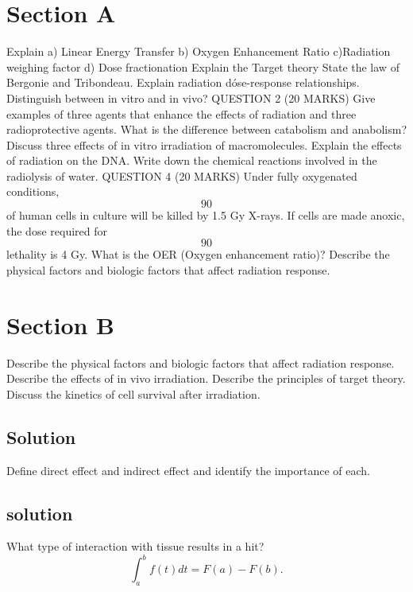 \documentclass{assignment}
\date{\today}                                   %
\begin{document}
\begin{problem}

\section{Section A}

\noindent Explain a) Linear Energy Transfer b) Oxygen Enhancement Ratio c)Radiation weighing factor d) Dose fractionation
\noindent Explain the Target theory
\noindent State the law of Bergonie and Tribondeau.
\noindent Explain radiation dóse-response relationships.
\noindent Distinguish between in vitro and in vivo?
\noindent QUESTION 2 (20 MARKS)
Give examples of three agents that enhance the effects of radiation and three radioprotective agents.
\noindent What is the difference between catabolism and anabolism?
\noindent Discuss three effects of in vitro irradiation of macromolecules.
\noindent Explain the effects of radiation on the DNA.
\noindent Write down the chemical reactions involved in the radiolysis of water.
\noindent QUESTION 4 (20 MARKS)
Under fully oxygenated conditions, \begin{equation}90%
\end{equation} of human cells in culture will be killed by 1.5 Gy X-rays. If
cells are made anoxic, the dose required for \begin{equation}
    90%
\end{equation} lethality is 4 Gy. What is the OER (Oxygen enhancement ratio)?
\noindent 
Describe the physical factors and biologic factors that affect radiation response.
\section{Section B}
\noindent 
Describe the physical factors and biologic factors that affect radiation response.
\noindent Describe the effects of in vivo irradiation.
\noindent Describe the principles of target theory. 
\noindent 
Discuss the kinetics of cell survival after irradiation.
\subsection{Solution}
\noindent Define direct effect and indirect effect and identify the importance of each.
\subsection{solution}
\noindent What type of interaction with tissue results in a hit?
\begin{equation}\label{eq:TeoremaFundamental}
    \int_a^b f(t)dt = F(a)-F(b).
\end{equation}

\end{problem}
\end{document}
